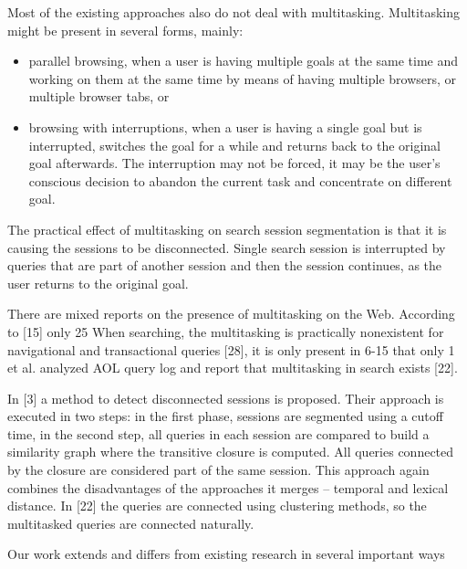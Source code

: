 \documentclass{acm_proc_article-sp} %
\begin{document}
Most of the existing approaches also do not deal with multitasking.
Multitasking might be present in several forms,
mainly:

\begin{itemize} 
	\item parallel browsing, when a user is having multiple goals
	at the same time and working on them at the same
	time by means of having multiple browsers, or multiple
	browser tabs, or
	\item browsing with interruptions, when a user is having a
	single goal but is interrupted, switches the goal for a
	while and returns back to the original goal afterwards.
	The interruption may not be forced, it may be the
	user’s conscious decision to abandon the current task
	and concentrate on different goal.
\end{itemize}

The practical effect of multitasking on search session segmentation
is that it is causing the sessions to be disconnected.
Single search session is interrupted by queries that
are part of another session and then the session continues,
as the user returns to the original goal.

There are mixed reports on the presence of multitasking on
the Web. According to [15] only 25%
When searching, the multitasking is practically nonexistent
for navigational and transactional queries [28], it is only
present in 6-15%
that only 1%
et al. analyzed AOL query log and report that multitasking
in search exists [22].

In [3] a method to detect disconnected sessions is proposed.
Their approach is executed in two steps: in the first phase,
sessions are segmented using a cutoff time, in the second
step, all queries in each session are compared to build a similarity
graph where the transitive closure is computed. All
queries connected by the closure are considered part of the
same session. This approach again combines the disadvantages
of the approaches it merges – temporal and lexical
distance. In [22] the queries are connected using clustering
methods, so the multitasked queries are connected naturally.

Our work extends and differs from existing research in several
important ways
\end{document}
